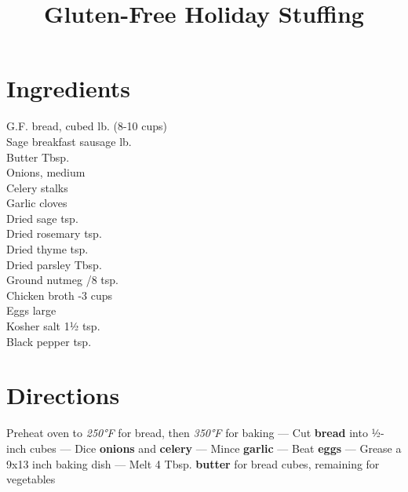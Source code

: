 \documentclass[11pt,letterpaper]{article}
\title{Gluten-Free Holiday Stuffing}
\author{}
\date{}
\begin{document}
\maketitle
\thispagestyle{empty}

\section*{Ingredients}
\setlength{\columnsep}{20pt}
\begin{multicols}{2}
\noindent
    G.F. bread, cubed  lb. (8-10 cups) \\
    Sage breakfast sausage  lb. \\
    Butter  Tbsp. \\
    Onions, medium  \\
    Celery stalks  \\
    Garlic cloves  \\
    \columnbreak
    Dried sage  tsp. \\
    Dried rosemary  tsp. \\
    Dried thyme  tsp. \\
    Dried parsley  Tbsp. \\
    Ground nutmeg /8 tsp. \\
    Chicken broth -3 cups \\
    Eggs  large \\
    Kosher salt \dotfill 1½ tsp. \\
    Black pepper  tsp.
\end{multicols}

\section*{Directions}

\noindent
Preheat oven to \textit{250°F} for bread, then \textit{350°F} for baking ---
Cut \textbf{bread} into ½-inch cubes ---
Dice \textbf{onions} and \textbf{celery} ---
Mince \textbf{garlic} ---
Beat \textbf{eggs} ---
Grease a 9x13 inch baking dish ---
Melt 4 Tbsp. \textbf{butter} for bread cubes, remaining for vegetables
\end{document}
